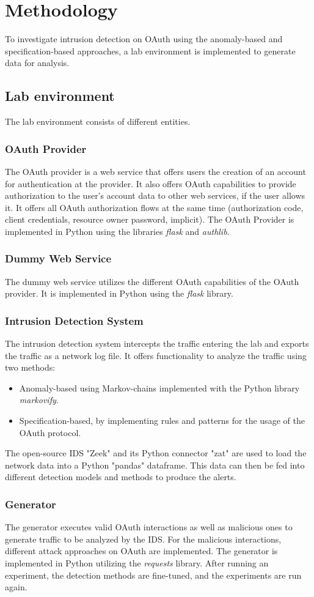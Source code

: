 \documentclass{article}
\begin{document}
\section{Methodology}
To investigate intrusion detection on OAuth using the anomaly-based and specification-based approaches, a lab environment is implemented to generate data for analysis.
\subsection{Lab environment}
The lab environment consists of different entities.
\subsubsection{OAuth Provider}
The OAuth provider is a web service that offers users the creation of an account for authentication at the provider. It also offers OAuth capabilities to provide authorization to the user's account data to other web services, if the user allows it. It offers all OAuth authorization flows at the same time (authorization code, client credentials, resource owner password, implicit). The OAuth Provider is implemented in Python using the libraries \emph{flask} and \emph{authlib}.
\subsubsection{Dummy Web Service}
The dummy web service utilizes the different OAuth capabilities of the OAuth provider. It is implemented in Python using the \emph{flask} library.
\subsubsection{Intrusion Detection System}
The intrusion detection system intercepts the traffic entering the lab and exports the traffic as a network log file. It offers functionality to analyze the traffic using two methods:
\begin{itemize}
\item Anomaly-based using Markov-chains implemented with the Python library \emph{markovify}.
\item Specification-based, by implementing rules and patterns for the usage of the OAuth protocol.
\end{itemize}
The open-source IDS "Zeek" and its Python connector "zat" are used to load the network data into a Python "pandas" dataframe. This data can then be fed into different detection models and methods to produce the alerts.
\subsubsection{Generator}
The generator executes valid OAuth interactions as well as malicious ones to generate traffic to be analyzed by the IDS. For the malicious interactions, different attack approaches on OAuth are implemented. The generator is implemented in Python utilizing the \emph{requests} library. After running an experiment, the detection methods are fine-tuned, and the experiments are run again.
\end{document}
